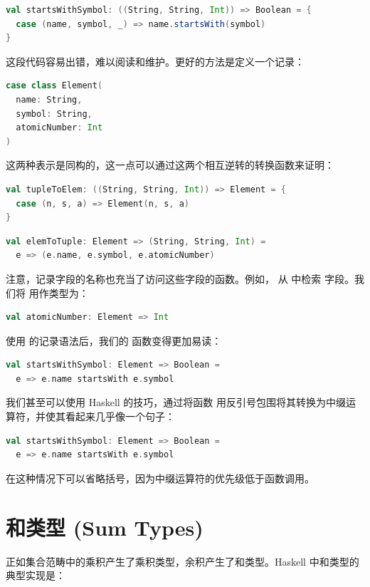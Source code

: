 \begin{lstlisting}[language=Scala]
val startsWithSymbol: ((String, String, Int)) => Boolean = {
  case (name, symbol, _) => name.startsWith(symbol)
}
\end{lstlisting}
这段代码容易出错，难以阅读和维护。更好的方法是定义一个记录：

\begin{lstlisting}[language=Scala]
case class Element(
  name: String,
  symbol: String,
  atomicNumber: Int
)
\end{lstlisting}
这两种表示是同构的，这一点可以通过这两个相互逆转的转换函数来证明：

\begin{lstlisting}[language=Scala]
val tupleToElem: ((String, String, Int)) => Element = {
  case (n, s, a) => Element(n, s, a)
}
\end{lstlisting}

\begin{lstlisting}[language=Scala]
val elemToTuple: Element => (String, String, Int) =
  e => (e.name, e.symbol, e.atomicNumber)
\end{lstlisting}
注意，记录字段的名称也充当了访问这些字段的函数。例如， 从  中检索  字段。我们将  用作类型为：

\begin{lstlisting}[language=Scala]
val atomicNumber: Element => Int
\end{lstlisting}
使用  的记录语法后，我们的  函数变得更加易读：

\begin{lstlisting}[language=Scala]
val startsWithSymbol: Element => Boolean =
  e => e.name startsWith e.symbol
\end{lstlisting}
我们甚至可以使用 Haskell 的技巧，通过将函数  用反引号包围将其转换为中缀运算符，并使其看起来几乎像一个句子：

\begin{lstlisting}[language=Scala]
val startsWithSymbol: Element => Boolean =
  e => e.name startsWith e.symbol
\end{lstlisting}
在这种情况下可以省略括号，因为中缀运算符的优先级低于函数调用。

\section{和类型 (Sum Types)}

正如集合范畴中的乘积产生了乘积类型，余积产生了和类型。Haskell 中和类型的典型实现是：

